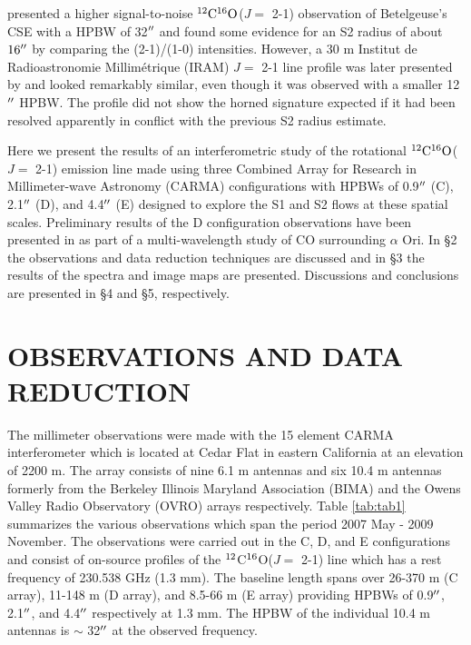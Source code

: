\documentclass[iop]{emulateapj}
\begin{document}
\cite{1987ApJ...313..400H} presented a higher signal-to-noise $\rm{{}^{12}C^{16}O}$($J=$ 2-1) observation of Betelgeuse's CSE with a HPBW of 32$\mbox{$^{\prime\prime}$}$ and found some evidence for an S2 radius of about $16\mbox{$^{\prime\prime}$}$ by comparing the  (2-1)/(1-0) intensities. However,  a 30 m Institut de Radioastronomie Millim\'etrique (IRAM) $J=$ 2-1 line profile was later presented by  \cite{1994ApJ...424L.127H} and looked remarkably similar, even though it was observed with a smaller 12$\mbox{$^{\prime\prime}$}$ HPBW. The profile did not show the horned signature expected if it had been resolved apparently in conflict with the previous S2 radius estimate.

Here we present the results of an interferometric study of the rotational $\rm{{}^{12}C^{16}O}$($J=$ 2-1) emission line made using three Combined Array for Research in Millimeter-wave Astronomy (CARMA) configurations with HPBWs of 0.9$\mbox{$^{\prime\prime}$}$ (C), 2.1$\mbox{$^{\prime\prime}$}$ (D), and 4.4$\mbox{$^{\prime\prime}$}$ (E) designed to explore the S1 and S2 flows at these spatial scales.  Preliminary results of the D configuration observations have been presented in \cite{2009AIPC.1094..868H} as part of a multi-wavelength study of CO surrounding $\alpha$ Ori. In \S2 the observations and data reduction techniques are discussed and in \S3 the results of the spectra and image maps are presented. Discussions and conclusions are presented in \S4 and \S5, respectively.

\section{OBSERVATIONS AND DATA REDUCTION}

The millimeter observations were made with the 15 element CARMA interferometer \citep{2004ASPC..314..768S} which is located at Cedar Flat in eastern California at an elevation of 2200 m. The array consists of nine 6.1 m antennas and six 10.4 m antennas formerly from the Berkeley Illinois Maryland Association (BIMA) and the Owens Valley Radio Observatory (OVRO) arrays respectively. Table \ref{tab:tab1} summarizes the various observations which span the period 2007 May - 2009 November. The observations were carried out in the C, D, and E configurations and consist of on-source profiles of the $\rm{{}^{12}}$C$\rm{{}^{16}}$O($J=$ 2-1) line which has a rest frequency of 230.538 GHz (1.3 mm). The baseline length spans over 26-370 m (C array), 11-148 m (D array), and 8.5-66 m (E array) providing HPBWs of 0.9$\mbox{$^{\prime\prime}$}$, 2.1$\mbox{$^{\prime\prime}$}$, and 4.4$\mbox{$^{\prime\prime}$}$ respectively at 1.3 mm. The HPBW of the individual 10.4 m antennas is $\sim$ 32$\mbox{$^{\prime\prime}$}$ at the observed frequency.
\end{document}
